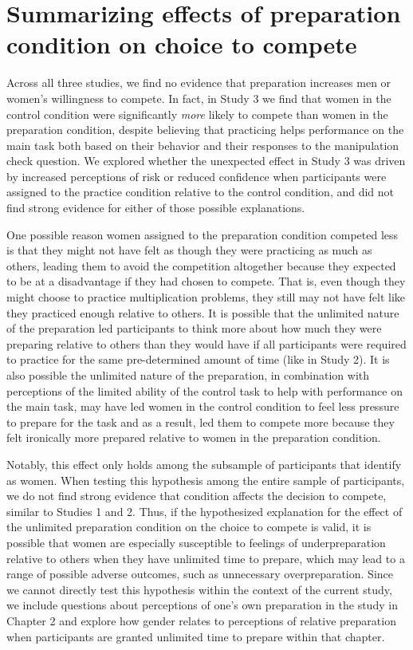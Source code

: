 \documentclass[a4paper, nobind]{templates/ociamthesis}
\begin{document}
\hypertarget{summarizing-effects-of-preparation-condition-on-choice-to-compete}{%
\section{Summarizing effects of preparation condition on choice to compete}\label{summarizing-effects-of-preparation-condition-on-choice-to-compete}}

Across all three studies, we find no evidence that preparation increases men or women's willingness to compete. In fact, in Study 3 we find that women in the control condition were significantly \emph{more} likely to compete than women in the preparation condition, despite believing that practicing helps performance on the main task both based on their behavior and their responses to the manipulation check question. We explored whether the unexpected effect in Study 3 was driven by increased perceptions of risk or reduced confidence when participants were assigned to the practice condition relative to the control condition, and did not find strong evidence for either of those possible explanations.

One possible reason women assigned to the preparation condition competed less is that they might not have felt as though they were practicing as much as others, leading them to avoid the competition altogether because they expected to be at a disadvantage if they had chosen to compete. That is, even though they might choose to practice multiplication problems, they still may not have felt like they practiced enough relative to others. It is possible that the unlimited nature of the preparation led participants to think more about how much they were preparing relative to others than they would have if all participants were required to practice for the same pre-determined amount of time (like in Study 2). It is also possible the unlimited nature of the preparation, in combination with perceptions of the limited ability of the control task to help with performance on the main task, may have led women in the control condition to feel less pressure to prepare for the task and as a result, led them to compete more because they felt ironically more prepared relative to women in the preparation condition.

Notably, this effect only holds among the subsample of participants that identify as women. When testing this hypothesis among the entire sample of participants, we do not find strong evidence that condition affects the decision to compete, similar to Studies 1 and 2. Thus, if the hypothesized explanation for the effect of the unlimited preparation condition on the choice to compete is valid, it is possible that women are especially susceptible to feelings of underpreparation relative to others when they have unlimited time to prepare, which may lead to a range of possible adverse outcomes, such as unnecessary overpreparation. Since we cannot directly test this hypothesis within the context of the current study, we include questions about perceptions of one's own preparation in the study in Chapter 2 and explore how gender relates to perceptions of relative preparation when participants are granted unlimited time to prepare within that chapter.
\end{document}
